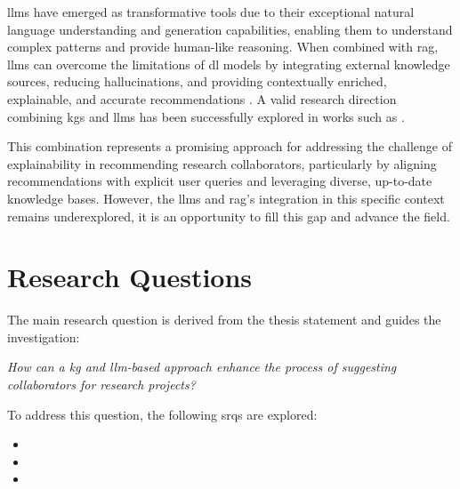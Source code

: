 \glspl{llm} have emerged as transformative tools due to their exceptional natural language understanding and generation capabilities, enabling them to understand complex patterns and provide human-like reasoning.
When combined with \gls{rag}, \glspl{llm} can overcome the limitations of \gls{dl} models by integrating external knowledge sources, reducing hallucinations, and providing contextually enriched, explainable, and accurate recommendations \cite{Deldjoo2024}.
A valid research direction combining \glspl{kg} and \glspl{llm} has been successfully explored in works such as \cite{Yang2024, Pan2024}.

This combination represents a promising approach for addressing the challenge of explainability in recommending research collaborators, particularly by aligning recommendations with explicit user queries and leveraging diverse, up-to-date knowledge bases.
However, the \glspl{llm} and \gls{rag}'s integration in this specific context remains underexplored, it is an opportunity to fill this gap and advance the field.
%
\section{Research Questions}\label{sec:research-questions}
The main research question is derived from the thesis statement and guides the investigation:
\begin{center}
	\textit{How can a \gls{kg} and \gls{llm}-based approach enhance the process of suggesting collaborators for research projects?}
\end{center}

To address this question, the following \glspl{srq} are explored:
\begin{itemize}
	\item \rqOne
	\item \rqTwo
	\item \rqThree
\end{itemize}


